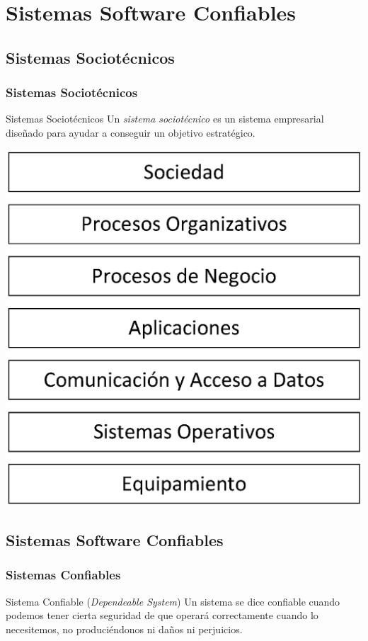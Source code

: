 \documentclass[handout,a4paper,slidestop,xcolor=pst,dvips,blue]{beamer}
\begin{document}
\section{Sistemas Software Confiables}

\subsection{Sistemas Sociotécnicos}

\begin{frame}[c]
    \frametitle{Sistemas Sociotécnicos}
    \begin{block}{Sistemas Sociotécnicos}
        Un \emph{sistema sociotécnico} es un sistema empresarial diseñado para ayudar a conseguir un objetivo estratégico.
    \end{block}
    \begin{center}
        \includegraphics[width=0.40\linewidth]{images/sociotecnicos/layers.eps}
    \end{center}
\end{frame}

\subsection{Sistemas Software Confiables}

\begin{frame}[c]
    \frametitle{Sistemas Confiables}
    \begin{block}{Sistema Confiable (\emph{Dependeable System})}
        Un sistema se dice confiable cuando podemos tener cierta seguridad de que operará correctamente cuando lo necesitemos, no produciéndonos ni daños ni perjuicios. 
    \end{block}
\end{frame}
\end{document}
